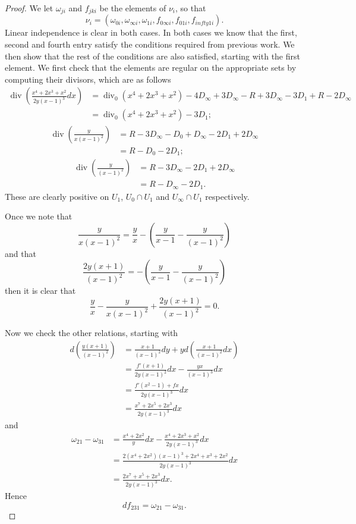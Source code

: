 \documentclass[draft, 11pt]{article} %
\theoremstyle{plain}
\theoremstyle{remark}
\DeclareMathOperator{\di}{div}
\begin{document}
\begin{proof}
We let $\omega_{ji}$ and $f_{jki}$ be the elements of $\nu_i$, so that
\[
\nu_i = (\omega_{0i}, \omega_{\infty i}, \omega_{1i}, f_{0\infty i}, f_{01i}, f_{infty 1 i} ).
\]
Linear independence is clear in both cases.
In both cases we know that the first, second and fourth entry satisfy the conditions required from previous work.
We then show that the rest of the conditions are also satisfied, starting with the first element.
We first check that the elements are regular on the appropriate sets by computing their divisors, which are as follows
\begin{align}
\di \left( \frac{x^4 + 2x^3 + x^2}{2y(x-1)^3}dx \right) & = \di_0(x^4 + 2x^3 + x^2) - 4D_\infty + 3D_\infty - R +3D_\infty -3D_1 +R - 2D_\infty \\& = \di_0(x^4 + 2x^3 + x^2) - 3D_1;
\end{align}
\begin{align}
\di \left(\frac{y}{x(x-1)^2} \right) & = R - 3D_\infty - D_0 + D_\infty - 2D_1 + 2D_\infty \\
& = R - D_0 - 2D_1;
\end{align}
\begin{align}
\di \left( \frac{y}{(x-1)^2} \right) & = R - 3D_\infty - 2D_1 + 2D_\infty \\
& = R - D_\infty - 2D_1.
\end{align}
These are clearly positive on $U_1$, $U_0 \cap U_1$ and $U_\infty \cap U_1$ respectively.

Once we note that 
\[
\frac{y}{x(x-1)^2} = \frac{y}{x} -\left(\frac{y}{x-1} - \frac{y}{(x-1)^2} \right)
\]
and that
\[
\frac{2y(x+1)}{(x-1)^2} = -\left( \frac{y}{x-1} - \frac{y}{(x-1)^2}\right)
\]
then it is clear that
\[
\frac{y}{x} - \frac{y}{x(x-1)^2} + \frac{2y(x+1)}{(x-1)^2} = 0.
\]

Now we check the other relations, starting with
\begin{align}
d \left( \frac{y(x+1)}{(x-1)^2} \right) & = \frac{x+1}{(x-1)^2}dy + y d \left( \frac{x+1}{(x-1)^2}dx \right) \\
& = \frac{f'(x+1)}{2y(x-1)^2}dx - \frac{yx}{(x-1)^3} dx \\
& = \frac{f'(x^2-1) +fx}{2y(x-1)^3}dx \\
& = \frac{x^7 + 2x^5 + 2x^3}{2y(x-1)^3}dx
\end{align}
and
\begin{align}
\omega_{21} - \omega_{31} & = \frac{x^4 + 2x^2}{y}dx - \frac{x^4 + 2x^3 + x^2}{2y(x-1)^3} dx \\
& = \frac{2(x^4 + 2x^2)(x-1)^3 + 2x^4 + x^3 + 2x^2}{2y(x-1)^3}dx \\
& = \frac{2x^7 + x^5 + 2x^3}{2y(x-1)^3}dx.
\end{align}
Hence 
\[
df_{231} = \omega_{21} - \omega_{31}.
\]


\end{proof}
\end{document}
